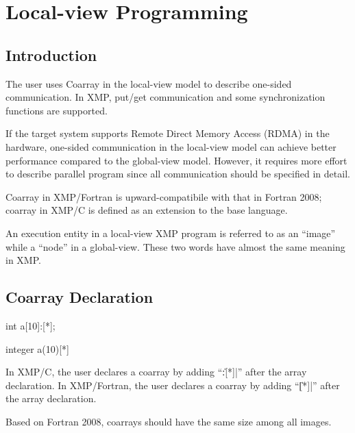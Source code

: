 \section{Local-view Programming}

\subsection{Introduction}

The user uses Coarray in the local-view model to describe one-sided
communication. In XMP, put/get communication and some synchronization
functions are supported.

If the target system supports Remote Direct Memory Access (RDMA) in the
hardware, one-sided communication in the local-view model can achieve
better performance compared to the global-view model. However, it
requires more effort to describe parallel program since all
communication should be specified in detail.


Coarray in XMP/Fortran is upward-compatibile with that in Fortran 2008;
coarray in XMP/C is defined as an extension to the base language.

An execution entity in a local-view XMP program is referred to as an 
``image'' while a ``node'' in a global-view.
%
These two words have almost the same meaning in XMP.

\subsection{Coarray Declaration}

\begin{XCexample}
int a[10]:[*];
\end{XCexample}

\begin{XFexample}
integer a(10)[*]
\end{XFexample}

In XMP/C, the user declares a coarray by adding ``\|:[*]|''
after the array declaration. In XMP/Fortran, the user declares a coarray
by adding ``\|[*]|'' after the array declaration.

\begin{mynote}
  Based on Fortran 2008, coarrays should have the same size among all
  images.
\end{mynote}

